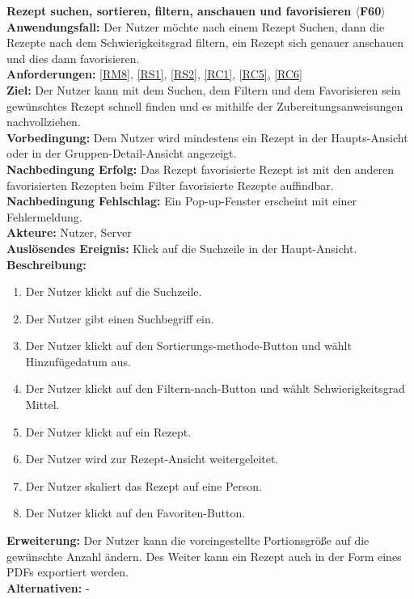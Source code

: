 \documentclass[parskip=full]{scrartcl}
\begin{document}
\textbf{Rezept suchen, sortieren, filtern, anschauen und favorisieren $\langle$F60$\rangle$}\\
\textbf{Anwendungsfall:} Der Nutzer möchte nach einem Rezept Suchen, dann die Rezepte nach dem Schwierigkeitsgrad filtern, ein Rezept sich genauer anschauen und dies dann favorisieren.\\
\textbf{Anforderungen:} \ref{RM8}, \ref{RS1}, \ref{RS2}, \ref{RC1}, \ref{RC5}, \ref{RC6}\\
\textbf{Ziel:} Der Nutzer kann mit dem Suchen, dem Filtern und dem Favorisieren sein gewünschtes Rezept schnell finden und es mithilfe der Zubereitungsanweisungen nachvollziehen.\\
\textbf{Vorbedingung:} Dem Nutzer wird mindestens ein Rezept in der Haupts-Ansicht oder in der Gruppen-Detail-Ansicht angezeigt.\\
\textbf{Nachbedingung Erfolg:} Das Rezept favorisierte Rezept ist mit den anderen favorisierten Rezepten beim Filter favorisierte Rezepte auffindbar.\\
\textbf{Nachbedingung Fehlschlag:} Ein Pop-up-Fenster erscheint mit einer Fehlermeldung.\\
\textbf{Akteure:} Nutzer, Server\\
\textbf{Auslösendes Ereignis:} Klick auf die Suchzeile in der Haupt-Ansicht.\\
\textbf{Beschreibung:}
\begin{enumerate}
    \item Der Nutzer klickt auf die Suchzeile.
    \item Der Nutzer gibt einen Suchbegriff ein.
    \item Der Nutzer klickt auf den Sortierungs-methode-Button und wählt Hinzufügedatum aus.
    \item Der Nutzer klickt auf den Filtern-nach-Button und wählt Schwierigkeitsgrad Mittel.
    \item Der Nutzer klickt auf ein Rezept.
    \item Der Nutzer wird zur Rezept-Ansicht weitergeleitet.
    \item Der Nutzer skaliert das Rezept auf eine Person.
    \item Der Nutzer klickt auf den Favoriten-Button.
\end{enumerate}
\textbf{Erweiterung:} Der Nutzer kann die voreingestellte Portionsgröße auf die gewünschte Anzahl ändern. Des Weiter kann ein Rezept auch in der Form eines PDFs exportiert werden.\\
\textbf{Alternativen:} -\\
\newpage
\end{document}

